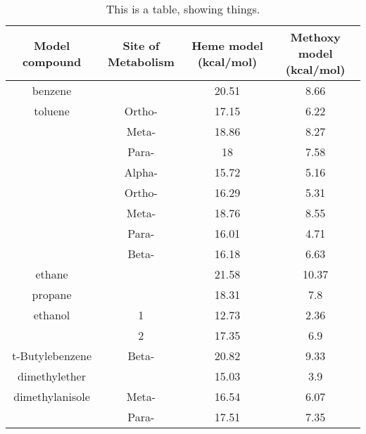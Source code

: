 \begin{table}[h]
\centering
\label{table:heme_methoxy}
\begin{tabular}{cccc}
\hline
Model compound & Site of Metabolism & Heme model (kcal/mol) & Methoxy model (kcal/mol) \\
\hline
benzene &  & 20.51 & 8.66 \\
toluene & Ortho- & 17.15 & 6.22 \\
 & Meta- & 18.86 & 8.27 \\
 & Para- & 18 & 7.58 \\
 & Alpha- & 15.72 & 5.16 \\
 & Ortho- & 16.29 & 5.31 \\
 & Meta- & 18.76 & 8.55 \\
 & Para- & 16.01 & 4.71 \\
 & Beta- & 16.18 & 6.63 \\
ethane &  & 21.58 & 10.37 \\
propane &  & 18.31 & 7.8 \\
ethanol & 1 & 12.73 & 2.36 \\
 & 2 & 17.35 & 6.9 \\
t-Butylebenzene & Beta- & 20.82 & 9.33 \\
dimethylether &  & 15.03 & 3.9 \\
dimethylanisole & Meta- & 16.54 & 6.07 \\
 & Para- & 17.51 & 7.35 \\
\hline
\end{tabular}
\caption{This is a table, showing things.}
\end{table}


